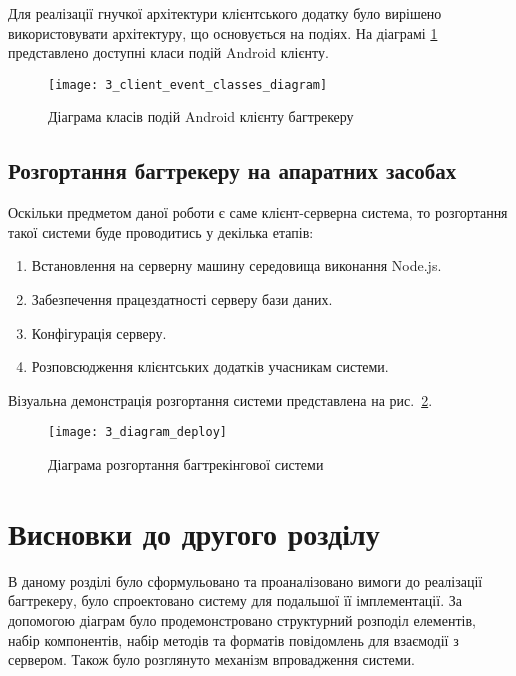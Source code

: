 \documentclass[../main.tex]{subfiles}
\begin{document}
		Для реалізації гнучкої архітектури клієнтського додатку було вирішено використовувати архітектуру, що основується на подіях. На діаграмі \ref{client_events} представлено доступні класи подій Android клієнту.
		
		\begin{figure}[H]
			\centering
			\texttt{[image: 3\_client\_event\_classes\_diagram]}
			\caption{Діаграма класів подій Android клієнту багтрекеру}
			\label{client_events}
		\end{figure}
	
	\subsection{Розгортання багтрекеру на апаратних засобах}
	
		Оскільки предметом даної роботи є саме клієнт-серверна система, то розгортання такої системи буде проводитись у декілька етапів:
		\begin{enumerate}
			\item Встановлення на серверну машину середовища виконання Node.js.
			\item Забезпечення працездатності серверу бази даних.
			\item Конфігурація серверу.
			\item Розповсюдження клієнтських додатків учасникам системи.
		\end{enumerate}
		
		Візуальна демонстрація розгортання системи представлена на рис.~\ref{diagram_deploy}. %
		
		\begin{figure}[H]
			\centering
			\texttt{[image: 3\_diagram\_deploy]}
			\caption{Діаграма розгортання багтрекінгової системи}
			\label{diagram_deploy}
		\end{figure}

\section{Висновки до другого розділу}
	В даному розділі було сформульовано та проаналізовано вимоги до реалізації багтрекеру, було спроектовано систему для подальшої її імплементації. За допомогою діаграм було продемонстровано структурний розподіл елементів, набір компонентів, набір методів та форматів повідомлень для взаємодії з сервером. Також було розглянуто механізм впровадження системи. 
	
\end{document}
